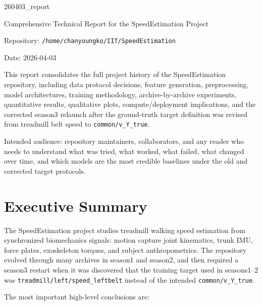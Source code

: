 \documentclass[11pt,a4paper]{article}
\begin{document}
\begin{titlepage}
\centering
{\LARGE 260403\_report\par}
\vspace{0.8cm}
{\Large Comprehensive Technical Report for the SpeedEstimation Project\par}
\vspace{0.8cm}
{\large Repository: \texttt{/home/chanyoungko/IIT/SpeedEstimation}\par}
\vspace{0.4cm}
{\large Date: 2026-04-03\par}
\vspace{1.2cm}
\begin{minipage}{0.92\linewidth}
\small
This report consolidates the full project history of the SpeedEstimation repository, including data protocol decisions, feature generation, preprocessing, model architectures, training methodology, archive-by-archive experiments, quantitative results, qualitative plots, compute/deployment implications, and the corrected season3 relaunch after the ground-truth target definition was revised from treadmill belt speed to \texttt{common/v\_Y\_true}.
\end{minipage}
\vfill
\begin{minipage}{0.92\linewidth}
\small
Intended audience: repository maintainers, collaborators, and any reader who needs to understand what was tried, what worked, what failed, what changed over time, and which models are the most credible baselines under the old and corrected target protocols.
\end{minipage}
\end{titlepage}

\tableofcontents
\clearpage

\section{Executive Summary}

The SpeedEstimation project studies treadmill walking speed estimation from synchronized biomechanics signals: motion capture joint kinematics, trunk IMU, force plates, exoskeleton torques, and subject anthropometrics. The repository evolved through many archives in season1 and season2, and then required a season3 restart when it was discovered that the training target used in seasons1--2 was \texttt{treadmill/left/speed\_leftbelt} instead of the intended \texttt{common/v\_Y\_true}.

The most important high-level conclusions are:
\end{document}
